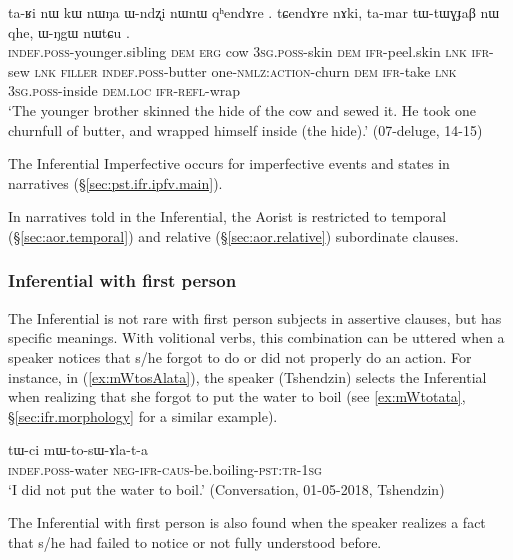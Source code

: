 \begin{exe}
\ex \label{ex:chArAGdWt.chAtsxWB}
 \gll ta-ʁi nɯ kɯ nɯŋa ɯ-ndʐi nɯnɯ  qʰendɤre . tɕendɤre nɤki, ta-mar tɯ-tɯɣɟaβ nɯ  qhe, ɯ-ŋgɯ nɯtɕu . \\
 \textsc{indef}.\textsc{poss}-younger.sibling \textsc{dem} \textsc{erg} cow \textsc{3sg}.\textsc{poss}-skin \textsc{dem} \textsc{ifr}-peel.skin \textsc{lnk} \textsc{ifr}-sew \textsc{lnk} \textsc{filler} \textsc{indef}.\textsc{poss}-butter one-\textsc{nmlz}:\textsc{action}-churn \textsc{dem} \textsc{ifr}-take \textsc{lnk} \textsc{3sg}.\textsc{poss}-inside \textsc{dem}.\textsc{loc} \textsc{ifr}-\textsc{refl}-wrap \\
 \glt `The younger brother skinned the hide of the cow and sewed it. He took one churnfull of butter, and wrapped himself inside (the hide).' (07-deluge, 14-15)
\end{exe}

The Inferential Imperfective occurs for imperfective events and states in narratives (§\ref{sec:pst.ifr.ipfv.main}).

In narratives told in the Inferential, the Aorist is restricted to temporal (§\ref{sec:aor.temporal}) and relative (§\ref{sec:aor.relative}) subordinate clauses.

\subsubsection{Inferential with first person} \label{sec:inf.1person}
The Inferential is not rare with first person subjects in assertive clauses, but has specific meanings.  With volitional verbs, this combination can be uttered when a speaker notices that s/he forgot to do or did not properly do an action. For instance, in (\ref{ex:mWtosAlata}), the speaker (Tshendzin) selects the Inferential when realizing that she forgot to put the water to boil (see \ref{ex:mWtotata}, §\ref{sec:ifr.morphology} for a similar example).

\begin{exe}
\ex \label{ex:mWtosAlata}
\gll tɯ-ci mɯ-to-sɯ-ɤla-t-a \\
\textsc{indef}.\textsc{poss}-water \textsc{neg}-\textsc{ifr}-\textsc{caus}-be.boiling-\textsc{pst}:\textsc{tr}-\textsc{1sg} \\
\glt `I did not put the water to boil.' (Conversation, 01-05-2018, Tshendzin)
\end{exe}

The Inferential with first person is also found when the speaker realizes a fact that s/he had failed to notice or not fully understood before.

